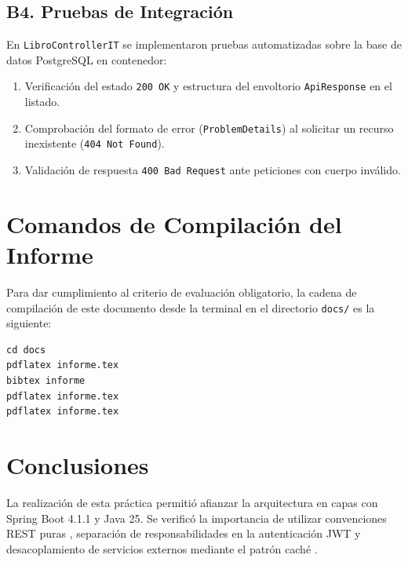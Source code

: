 \documentclass[11pt,a4paper]{article}
\begin{document}
\subsection{B4. Pruebas de Integración}
En \texttt{LibroControllerIT} se implementaron pruebas automatizadas sobre la base de datos PostgreSQL en contenedor:
\begin{enumerate}
    \item Verificación del estado \texttt{200 OK} y estructura del envoltorio \texttt{ApiResponse} en el listado.
    \item Comprobación del formato de error (\texttt{ProblemDetails}) al solicitar un recurso inexistente (\texttt{404 Not Found}).
    \item Validación de respuesta \texttt{400 Bad Request} ante peticiones con cuerpo inválido.
\end{enumerate}

\section{Comandos de Compilación del Informe}

Para dar cumplimiento al criterio de evaluación obligatorio, la cadena de compilación de este documento desde la terminal en el directorio \texttt{docs/} es la siguiente:

\begin{lstlisting}[style=bash]
cd docs
pdflatex informe.tex
bibtex informe
pdflatex informe.tex
pdflatex informe.tex
\end{lstlisting}

\section{Conclusiones}

La realización de esta práctica permitió afianzar la arquitectura en capas con Spring Boot 4.1.1 y Java 25. Se verificó la importancia de utilizar convenciones REST puras \cite{fielding2002principled}, separación de responsabilidades en la autenticación JWT y desacoplamiento de servicios externos mediante el patrón caché \cite{pautasso2008restful, taibi2020architectural}.



\end{document}
